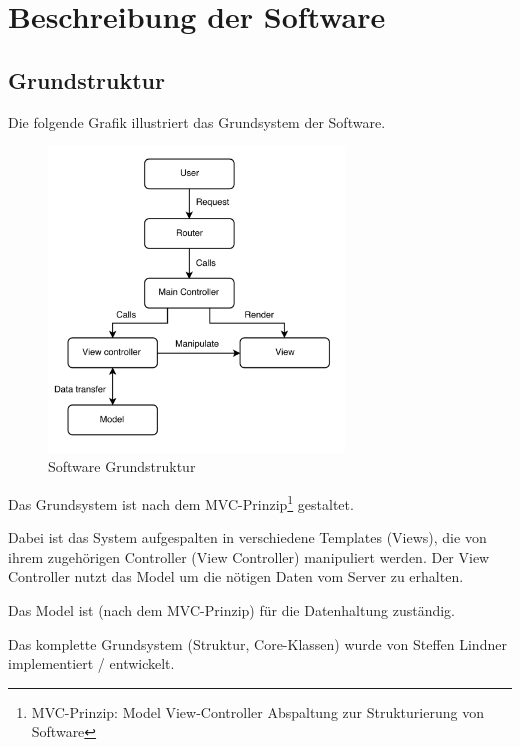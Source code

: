 \chapter{Beschreibung der Software}

\section{Grundstruktur}

Die folgende Grafik illustriert das Grundsystem der Software.

\begin{figure}[h!]
		\centering
        \includegraphics[width=0.7\textwidth]{./Includes/Software/architektur.png}
    \caption{Software Grundstruktur}
    \label{fig:somthing}
\end{figure}

Das Grundsystem ist nach dem MVC-Prinzip\footnote{MVC-Prinzip: Model View-Controller Abspaltung zur Strukturierung von Software} gestaltet.

\pm

Dabei ist das System aufgespalten in verschiedene Templates (Views),
die von ihrem zugehörigen Controller (View Controller) manipuliert 
werden. Der View Controller nutzt das Model um die nötigen Daten vom
Server zu erhalten.

\pm

Das Model ist (nach dem MVC-Prinzip) für die Datenhaltung zuständig.

\pm

 Das komplette Grundsystem (Struktur, Core-Klassen) wurde von Steffen Lindner implementiert / entwickelt. 

